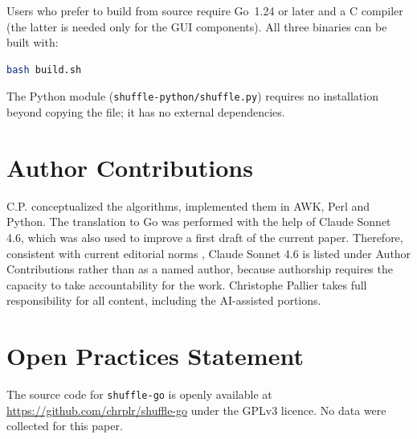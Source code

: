 \documentclass[doc,a4paper,biblatex]{apa7}
\begin{document}
Users who prefer to build from source require Go~1.24 or later and a C
compiler (the latter is needed only for the GUI components). All three
binaries can be built with:

\begin{lstlisting}[language=bash]
bash build.sh
\end{lstlisting}

\noindent
The Python module (\texttt{shuffle-python/shuffle.py}) requires no
installation beyond copying the file; it has no external dependencies.

\section*{Author Contributions}

C.P. conceptualized the algorithms, implemented them in AWK, Perl and
Python. The translation to Go was performed with the help of Claude
Sonnet 4.6, which was also used to improve a first draft of the current
paper.  Therefore, consistent with current editorial norms
\parencite{natureportfolio2023, springernature2023}, Claude Sonnet 4.6
is listed under Author Contributions rather than as a named author,
because authorship requires the capacity to take accountability for
the work.  Christophe Pallier takes full responsibility for all
content, including the AI-assisted portions.

\section*{Open Practices Statement}

The source code for \texttt{shuffle-go} is openly available at \url{https://github.com/chrplr/shuffle-go}
under the GPLv3 licence. No data were collected for this paper.

\printbibliography
\end{document}
